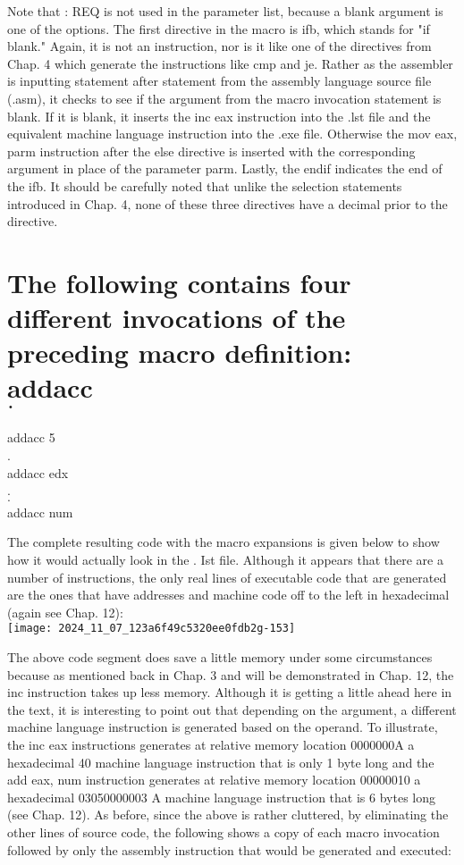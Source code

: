 \documentclass[10pt]{article}
\begin{document}
Note that : REQ is not used in the parameter list, because a blank argument is one of the options. The first directive in the macro is ifb, which stands for "if blank." Again, it is not an instruction, nor is it like one of the directives from Chap. 4 which generate the instructions like cmp and je. Rather as the assembler is inputting statement after statement from the assembly language source file (.asm), it checks to see if the argument from the macro invocation statement is blank. If it is blank, it inserts the inc eax instruction into the .lst file and the equivalent machine language instruction into the .exe file. Otherwise the mov eax, parm instruction after the else directive is inserted with the corresponding argument in place of the parameter parm. Lastly, the endif indicates the end of the ifb. It should be carefully noted that unlike the selection statements introduced in Chap. 4, none of these three directives have a decimal prior to the directive.

\section*{The following contains four different invocations of the preceding macro definition:\\
addacc\\
$\cdot$}
addacc 5\\
.\\
addacc edx\\
.\\
$\cdot$\\
addacc num

The complete resulting code with the macro expansions is given below to show how it would actually look in the . Ist file. Although it appears that there are a number of instructions, the only real lines of executable code that are generated are the ones that have addresses and machine code off to the left in hexadecimal (again see Chap. 12):\\
\texttt{[image: 2024\_11\_07\_123a6f49c5320ee0fdb2g-153]}

The above code segment does save a little memory under some circumstances because as mentioned back in Chap. 3 and will be demonstrated in Chap. 12, the inc instruction takes up less memory. Although it is getting a little ahead here in the text, it is interesting to point out that depending on the argument, a different machine language instruction is generated based on the operand. To illustrate, the inc eax instructions generates at relative memory location 0000000A a hexadecimal 40 machine language instruction that is only 1 byte long and the add eax, num instruction generates at relative memory location 00000010 a hexadecimal 03050000003 A machine language instruction that is 6 bytes long (see Chap. 12). As before, since the above is rather cluttered, by eliminating the other lines of source code, the following shows a copy of each macro invocation followed by only the assembly instruction that would be generated and executed:
\end{document}
